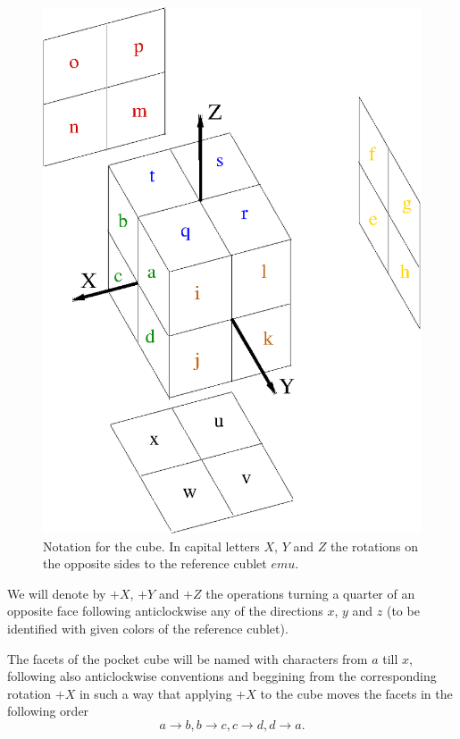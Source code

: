 \documentclass[a4paper,12pt]{article}
\begin{document}
\begin{figure}[!ht]
\begin{center}
\includegraphics{notation}
\end{center}
\caption{Notation for the cube. In capital letters $X$, $Y$ and $Z$ the rotations on the opposite
  sides to the reference cublet $emu$.}
\label{notation}
\end{figure}

We will denote by $+X$,  $+Y$ and $+Z$ the operations turning a quarter
of an opposite face following anticlockwise any of the directions $x$, $y$
and $z$ (to be identified with given colors of the reference cublet).

The facets of the pocket cube will be named with characters from $a$
till $x$, following also anticlockwise conventions and beggining from
the corresponding rotation $+X$ in such a way that applying $+X$ to
the cube moves the facets in the following order
\begin{equation}
a \rightarrow b, b \rightarrow c, c \rightarrow d, d \rightarrow a.
\end{equation}
\end{document}
